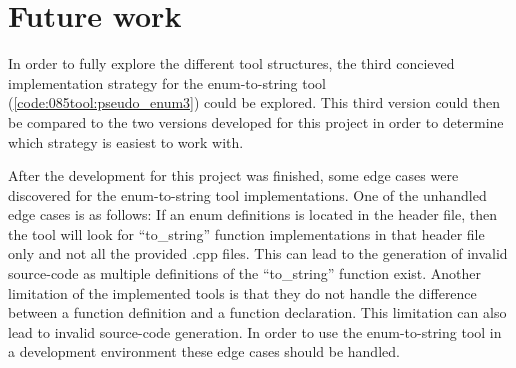\section{Future work}

In order to fully explore the different tool structures, the third concieved implementation strategy for the enum-to-string tool (\cref{code:085tool:pseudo_enum3}) could be explored. 
This third version could then be compared to the two versions developed for this project in order to determine which strategy is easiest to work with. %

After the development for this project was finished, some edge cases were discovered for the enum-to-string tool implementations. 
One of the unhandled edge cases is as follows:
If an enum definitions is located in the header file, then the tool will look for ``to\_string'' function implementations in that header file only and not all the provided .cpp files. 
This can lead to the generation of invalid source-code as multiple definitions of the ``to\_string'' function exist.
Another limitation of the implemented tools is that they do not handle the difference between a function definition and a function declaration.
This limitation can also lead to invalid source-code generation. 
In order to use the enum-to-string tool in a development environment these edge cases should be handled.



